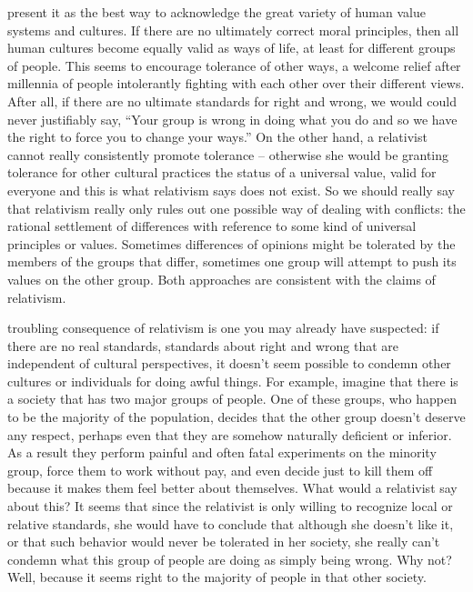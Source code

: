 \documentclass[justified]{tufte-book}
\begin{document}
 present it as the best way to acknowledge the great variety of human value systems and cultures. If there are no ultimately correct moral principles, then all human cultures become equally valid as ways of life, at least for different groups of people. This seems to encourage tolerance of other ways, a welcome relief after millennia of people intolerantly fighting with each other over their different views. After all, if there are no ultimate standards for right and wrong, we would could never justifiably say, ``Your group is wrong in doing what you do and so we have the right to force you to change your ways.'' On the other hand, a relativist cannot really consistently promote tolerance -- otherwise she would be granting tolerance for other cultural practices the status of a universal value, valid for everyone and this is what relativism says does not exist. So we should really say that relativism really only rules out one possible way of dealing with conflicts: the rational settlement of differences with reference to some kind of universal principles or values. Sometimes differences of opinions might be tolerated by the members of the groups that differ, sometimes one group will attempt to push its values on the other group. Both approaches are consistent with the claims of relativism.

 troubling consequence of relativism is one you may already have suspected: if there are no real standards, standards about right and wrong that are independent of cultural perspectives, it doesn't seem possible to condemn other cultures or individuals for doing awful things. For example, imagine that there is a society that has two major groups of people. One of these groups, who happen to be the majority of the population, decides that the other group doesn't deserve any respect, perhaps even that they are somehow naturally deficient or inferior. As a result they perform painful and often fatal experiments on the minority group, force them to work without pay, and even decide just to kill them off because it makes them feel better about themselves. What would a relativist say about this? It seems that since the relativist is only willing to recognize local or relative standards, she would have to conclude that although she doesn't like it, or that such behavior would never be tolerated in her society, she really can't condemn what this group of people are doing as simply being wrong. Why not? Well, because it seems right to the majority of people in that other society.
\end{document}
